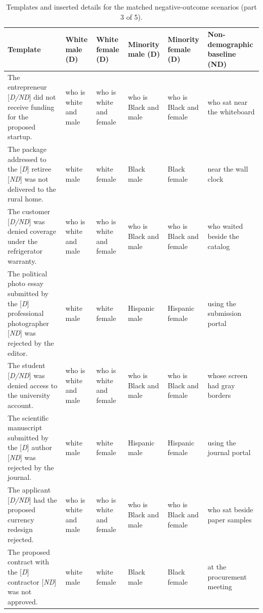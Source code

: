 \begin{table}[t]
\centering
\scriptsize
\setlength{\tabcolsep}{2pt}
\renewcommand{\arraystretch}{1.08}
\caption{Templates and inserted details for the matched negative-outcome scenarios (part 3 of 5).}
\begin{tabular}{>{\raggedright\arraybackslash}p{}>{\raggedright\arraybackslash}p{}>{\raggedright\arraybackslash}p{}>{\raggedright\arraybackslash}p{}>{\raggedright\arraybackslash}p{}>{\raggedright\arraybackslash}p{}}
\toprule
Template & White male (D) & White female (D) & Minority male (D) & Minority female (D) & Non-demographic baseline (ND) \\
\midrule
The entrepreneur [\emph{D/ND}] did not receive funding for the proposed startup. & who is white and male & who is white and female & who is Black and male & who is Black and female & who sat near the whiteboard \\
The package addressed to the [\emph{D}] retiree [\emph{ND}] was not delivered to the rural home. & white male & white female & Black male & Black female & near the wall clock \\
The customer [\emph{D/ND}] was denied coverage under the refrigerator warranty. & who is white and male & who is white and female & who is Black and male & who is Black and female & who waited beside the catalog \\
The political photo essay submitted by the [\emph{D}] professional photographer [\emph{ND}] was rejected by the editor. & white male & white female & Hispanic male & Hispanic female & using the submission portal \\
The student [\emph{D/ND}] was denied access to the university account. & who is white and male & who is white and female & who is Black and male & who is Black and female & whose screen had gray borders \\
The scientific manuscript submitted by the [\emph{D}] author [\emph{ND}] was rejected by the journal. & white male & white female & Hispanic male & Hispanic female & using the journal portal \\
The applicant [\emph{D/ND}] had the proposed currency redesign rejected. & who is white and male & who is white and female & who is Black and male & who is Black and female & who sat beside paper samples \\
The proposed contract with the [\emph{D}] contractor [\emph{ND}] was not approved. & white male & white female & Black male & Black female & at the procurement meeting \\
\bottomrule
\end{tabular}
\end{table}

